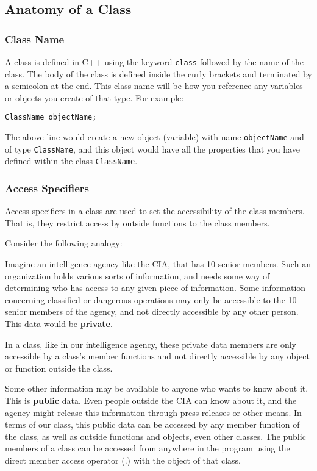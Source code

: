 \subsection{Anatomy of a Class}
\subsubsection{Class Name}
A class is defined in C++ using the keyword \texttt{class} followed by the name of the class. The body of the class is defined inside the curly brackets and terminated by a semicolon at the end. This class name will be how you reference any variables or objects you create of that type. For example: 

\texttt{ClassName objectName;}

The above line would create a new object (variable) with name \texttt{objectName} and of type \texttt{ClassName}, and this object would have all the properties that you have defined within the class \texttt{ClassName}.

\subsubsection{Access Specifiers}
Access specifiers in a class are used to set the accessibility of the class members. That is, they restrict access by outside functions to the class members.

Consider the following analogy:

Imagine an intelligence agency like the CIA, that has 10 senior members. Such an organization holds various sorts of information, and needs some way of determining who has access to any given piece of information. Some information concerning classified or dangerous operations may only be accessible to the 10 senior members of the agency, and not directly accessible by any other person. This data would be \textbf{private}.

In a class, like in our intelligence agency, these private data members are only accessible by a class's member functions and not directly accessible by any object or function outside the class.

Some other information may be available to anyone who wants to know about it. This is \textbf{public} data. Even people outside the CIA can know about it, and the agency might release this information through press releases or other means. In terms of our class, this public data can be accessed by any member function of the class, as well as outside functions and objects, even other classes. The public members of a class can be accessed from anywhere in the program using the direct member access operator (.) with the object of that class.

